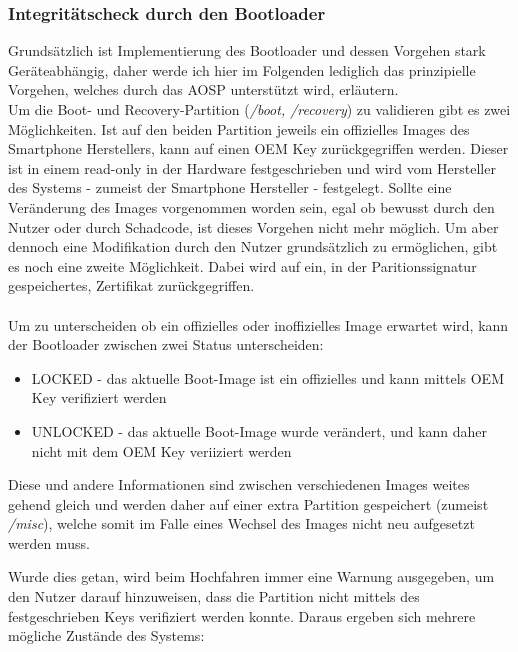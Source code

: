 	\subsubsection{Integritätscheck durch den Bootloader}
	Grundsätzlich ist Implementierung des Bootloader und dessen Vorgehen stark Geräteabhängig, daher werde ich hier im Folgenden lediglich das prinzipielle Vorgehen, welches durch das AOSP unterstützt wird, erläutern.\\
	Um die Boot- und Recovery-Partition (\textit{/boot, /recovery}) zu validieren gibt es zwei Möglichkeiten. Ist auf den beiden Partition jeweils ein offizielles Images des Smartphone Herstellers, kann auf einen OEM Key zurückgegriffen werden. Dieser ist in einem read-only in der Hardware festgeschrieben und wird vom Hersteller des Systems - zumeist der Smartphone Hersteller - festgelegt. Sollte eine Veränderung des Images vorgenommen worden sein, egal ob bewusst durch den Nutzer oder durch Schadcode, ist dieses Vorgehen nicht mehr möglich. Um aber dennoch eine Modifikation durch den Nutzer grundsätzlich zu ermöglichen, gibt es noch eine zweite Möglichkeit. Dabei wird auf ein, in der Paritionssignatur gespeichertes, Zertifikat zurückgegriffen.\\\\
	Um zu unterscheiden ob ein offizielles oder inoffizielles Image erwartet wird, kann der Bootloader zwischen zwei Status unterscheiden:\\
	
	\begin{itemize}\itemsep0pt
		\item LOCKED - das aktuelle Boot-Image ist ein offizielles und kann mittels OEM Key verifiziert werden
		\item UNLOCKED - das aktuelle Boot-Image wurde verändert, und kann daher nicht mit dem OEM Key veriiziert werden
	\end{itemize}
	
\begin{flushleft}
	Diese und andere Informationen sind zwischen verschiedenen Images weites gehend gleich und werden daher auf einer extra Partition gespeichert (zumeist \textit{/misc}), welche somit im Falle eines Wechsel des Images nicht neu aufgesetzt werden muss.
\end{flushleft}
	 Wurde dies getan, wird beim Hochfahren immer eine Warnung ausgegeben, um den Nutzer darauf hinzuweisen, dass die Partition nicht mittels des festgeschrieben Keys verifiziert werden konnte. Daraus ergeben sich mehrere mögliche Zustände des Systems:\\\\
	
